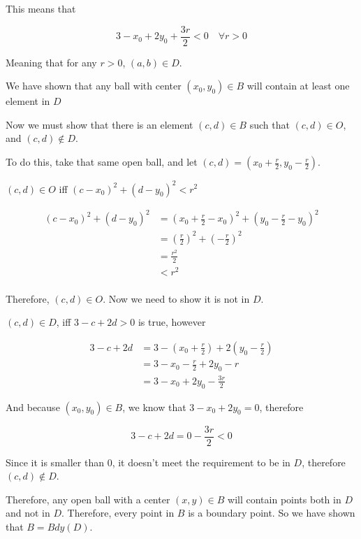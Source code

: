 \documentclass[12pt]{article} %
\begin{document}
\begin{homeworkProblem}
    This means that

    $$
        3 - x_0 + 2y_0 + \frac{3r}{2} < 0 \quad \forall r > 0
    $$

    Meaning that for any $r > 0$, $(a, b) \in D$.

    We have shown that any ball with center $(x_0, y_0) \in B$ will contain at least one element in $D$

    Now we must show that there is an element $(c, d) \in B$ such that $(c, d) \in O$, and $(c, d) \not \in D$.

    To do this, take that same open ball, and let $(c, d) = (x_0 + \frac{r}{2}, y_0 - \frac{r}{2})$.

    $(c, d) \in O$ iff $(c - x_0)^2 + (d - y_0)^2 < r^2$

    \begin{align*}
        (c - x_0)^2 + (d - y_0)^2
         & = (x_0 + \frac{r}{2} - x_0)^2 + (y_0 - \frac{r}{2} - y_0)^2 \\
         & = (\frac{r}{2})^2 + (-\frac{r}{2})^2                        \\
         & = \frac{r^2}{2}                                             \\
         & < r^2                                                       \\
    \end{align*}

    Therefore, $(c, d) \in O$. Now we need to show it is not in $D$.

    $(c, d) \in D$, iff $3 - c + 2d > 0$ is true, however

    \begin{align*}
        3 - c + 2d
         & = 3 -(x_0 + \frac{r}{2}) + 2 (y_0 - \frac{r}{2}) \\
         & = 3 - x_0 - \frac{r}{2} + 2y_0 - r               \\
         & = 3 - x_0 + 2y_0 - \frac{3r}{2}
    \end{align*}

    And because $(x_0, y_0) \in B$, we know that $3 - x_0 + 2y_0 = 0$, therefore

    $$
        3 - c + 2d = 0 - \frac{3r}{2} < 0
    $$

    Since it is smaller than 0, it doesn't meet the requirement to be in $D$, therefore $(c, d) \not \in D$.

    Therefore, any open ball with a center $(x, y) \in B$ will contain points both in $D$ and not in $D$. Therefore, every point
    in $B$ is a boundary point. So we have shown that $B = Bdy(D)$.


\end{homeworkProblem}
\end{document}
